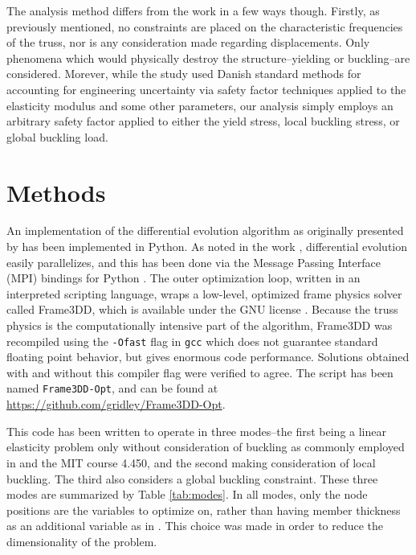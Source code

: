 \documentclass{article}
\begin{document}
The analysis method differs from the work \cite{pedersenOptimizationPracticalTrusses2003} in
a few ways though. Firstly, as previously mentioned, no constraints are placed on the characteristic
frequencies of the truss, nor is any consideration made regarding displacements. Only
phenomena which would physically destroy the structure--yielding or buckling--are considered.
Morever, while the study \cite{pedersenOptimizationPracticalTrusses2003} used Danish standard
methods for accounting for engineering uncertainty via safety factor techniques applied to
the elasticity modulus and some other parameters, our analysis simply employs an arbitrary
safety factor applied to either the yield stress, local buckling stress, or global buckling
load.

\section{Methods}

An implementation of the differential evolution algorithm as originally presented by \cite{stornDifferentialEvolutionSimple1997}
has been implemented in Python. As noted in the work \cite{stornDifferentialEvolutionSimple1997}, differential evolution
easily parallelizes, and this has been done via the Message Passing Interface (MPI) \cite{groppUsingMPI2nd1999} bindings
for Python \cite{dalcinParallelDistributedComputing2011}. The outer optimization loop, written in an interpreted scripting
language, wraps a low-level, optimized frame physics solver called Frame3DD, which is available under the GNU license \cite{gavinUserManualReference}.
Because the truss physics is the computationally intensive part of the algorithm, Frame3DD was recompiled using the \texttt{-Ofast}
flag in \texttt{gcc} \cite{stallmanUsingGnuCompiler2009} which does not guarantee standard floating point behavior, but
gives enormous code performance. Solutions obtained with and without this compiler flag were verified to agree. The script
has been named \texttt{Frame3DD-Opt}, and can be found at \url{https://github.com/gridley/Frame3DD-Opt}.

This code has been written to operate in three modes--the first being a linear elasticity problem only without consideration
of buckling as commonly employed in \cite{muellerComputationalExplorationStructural2014} and the MIT course 4.450, and
the second making consideration of local buckling. The third also considers a global buckling constraint.
These three modes are summarized by Table \ref{tab:modes}.
In all modes, only the node positions are the variables
to optimize on, rather than having member thickness as an additional variable as in \cite{pedersenOptimizationPracticalTrusses2003}.
This choice was made in order to reduce the dimensionality of the problem.
\end{document}
